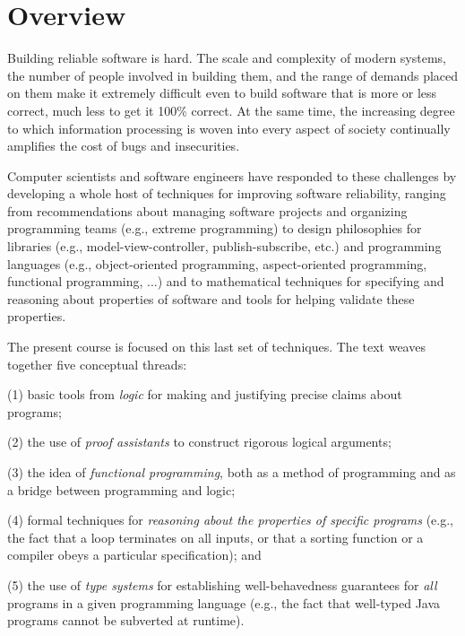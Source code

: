 \documentclass[12pt]{report}
\begin{document}
\section{Overview}



 Building reliable software is hard.  The scale and complexity of
    modern systems, the number of people involved in building them,
    and the range of demands placed on them make it extremely
    difficult even to build software that is more or less correct,
    much less to get it 100\% correct.  At the same time, the
    increasing degree to which information processing is woven into
    every aspect of society continually amplifies the cost of bugs and
    insecurities.


    Computer scientists and software engineers have responded to these
    challenges by developing a whole host of techniques for improving
    software reliability, ranging from recommendations about managing
    software projects and organizing programming teams (e.g., extreme
    programming) to design philosophies for libraries (e.g.,
    model-view-controller, publish-subscribe, etc.) and programming
    languages (e.g., object-oriented programming, aspect-oriented
    programming, functional programming, ...) and to mathematical
    techniques for specifying and reasoning about properties of
    software and tools for helping validate these properties.


    The present course is focused on this last set of techniques.  The
    text weaves together five conceptual threads:


    (1) basic tools from \textit{logic} for making and justifying precise
        claims about programs;


    (2) the use of \textit{proof assistants} to construct rigorous logical
        arguments;


    (3) the idea of \textit{functional programming}, both as a method of
        programming and as a bridge between programming and logic;


    (4) formal techniques for \textit{reasoning about the properties of
        specific programs} (e.g., the fact that a loop terminates on
        all inputs, or that a sorting function or a compiler obeys a
        particular specification); and


    (5) the use of \textit{type systems} for establishing well-behavedness
        guarantees for \textit{all} programs in a given programming
        language (e.g., the fact that well-typed Java programs cannot
        be subverted at runtime).
\end{document}
